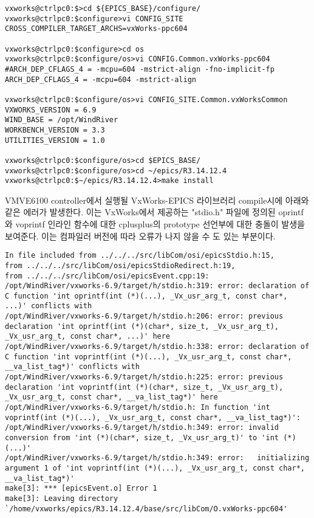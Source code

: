 \documentclass[11pt
  , a4paper
  , article
  , oneside
]{memoir}
\begin{document}
\begin{lstlisting}[style=termstyle]
vxworks@ctrlpc0:$>cd ${EPICS_BASE}/configure/
vxworks@ctrlpc0:$configure>vi CONFIG_SITE
CROSS_COMPILER_TARGET_ARCHS=vxWorks-ppc604

vxworks@ctrlpc0:$configure>cd os
vxworks@ctrlpc0:$configure/os>vi CONFIG.Common.vxWorks-ppc604
#ARCH_DEP_CFLAGS_4 = -mcpu=604 -mstrict-align -fno-implicit-fp
ARCH_DEP_CFLAGS_4 = -mcpu=604 -mstrict-align

vxworks@ctrlpc0:$configure/os>vi CONFIG_SITE.Common.vxWorksCommon
VXWORKS_VERSION = 6.9
WIND_BASE = /opt/WindRiver
WORKBENCH_VERSION = 3.3
UTILITIES_VERSION = 1.0

vxworks@ctrlpc0:$configure/os>cd $EPICS_BASE/
vxworks@ctrlpc0:$configure/os>cd ~/epics/R3.14.12.4
vxworks@ctrlpc0:$~/epics/R3.14.12.4>make install
\end{lstlisting}

VMVE6100 controller에서 실행될 VxWorks-EPICS 라이브러리 compile시에 아래와 같은 에러가 발생한다. 이는 VxWorks에서 제공하는 "stdio.h" 파일에 정의된 oprintf와 voprintf 인라인 함수에 대한 cplusplus의 prototype 선언부에 대한 충돌이 발생을 보여준다. 이는 컴파일러 버전에 따라 오류가 나지 않을 수 도 있는 부분이다. 

\begin{lstlisting}[style=termstyle]
In file included from ../../../src/libCom/osi/epicsStdio.h:15,
from ../../../src/libCom/osi/epicsStdioRedirect.h:19,
from ../../../src/libCom/osi/epicsEvent.cpp:19:
/opt/WindRiver/vxworks-6.9/target/h/stdio.h:319: error: declaration of C function 'int oprintf(int (*)(...), _Vx_usr_arg_t, const char*, ...)' conflicts with
/opt/WindRiver/vxworks-6.9/target/h/stdio.h:206: error: previous declaration 'int oprintf(int (*)(char*, size_t, _Vx_usr_arg_t), _Vx_usr_arg_t, const char*, ...)' here
/opt/WindRiver/vxworks-6.9/target/h/stdio.h:338: error: declaration of C function 'int voprintf(int (*)(...), _Vx_usr_arg_t, const char*, __va_list_tag*)' conflicts with
/opt/WindRiver/vxworks-6.9/target/h/stdio.h:225: error: previous declaration 'int voprintf(int (*)(char*, size_t, _Vx_usr_arg_t), _Vx_usr_arg_t, const char*, __va_list_tag*)' here
/opt/WindRiver/vxworks-6.9/target/h/stdio.h: In function 'int voprintf(int (*)(...), _Vx_usr_arg_t, const char*, __va_list_tag*)':
/opt/WindRiver/vxworks-6.9/target/h/stdio.h:349: error: invalid conversion from 'int (*)(char*, size_t, _Vx_usr_arg_t)' to 'int (*)(...)'
/opt/WindRiver/vxworks-6.9/target/h/stdio.h:349: error:   initializing argument 1 of 'int voprintf(int (*)(...), _Vx_usr_arg_t, const char*, __va_list_tag*)'
make[3]: *** [epicsEvent.o] Error 1
make[3]: Leaving directory `/home/vxworks/epics/R3.14.12.4/base/src/libCom/O.vxWorks-ppc604'
\end{lstlisting}
\end{document}
